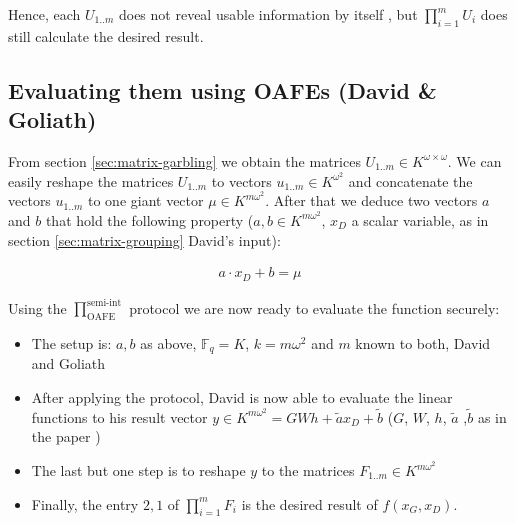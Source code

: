 \documentclass[12pt, a4paper]{article}
\begin{document}
\noindent{} Hence, each $U_{1..m}$ does not reveal usable information by itself
\cite{cramer03}, but $\prod_{i=1}^m U_i$ does still calculate the desired
result.


\subsection{Evaluating them using OAFEs (David \& Goliath)}

From section \ref{sec:matrix-garbling} we obtain the matrices $U_{1..m} \in
K^{\omega \times \omega}$. We can easily reshape the matrices $U_{1..m}$ to
vectors $u_{1..m} \in K^{\omega^2}$ and concatenate the vectors $u_{1..m}$ to
one giant vector $\mu \in K^{m\omega^2}$. After that we deduce two vectors $a$
and $b$ that hold the following property ($a, b \in K^{m\omega^2}$, $x_D$ a
scalar variable, as in section \ref{sec:matrix-grouping} David's input):

\begin{align}
a \cdot x_D + b = \mu
\end{align}

Using the $\prod^{\text{semi-int}}_{\text{OAFE}}$ protocol\cite{davidgoliath} we
are now ready to evaluate the function securely:

\begin{itemize}

\item The setup is: $a, b$ as above, $\mathbb{F}_q = K$, $k = m\omega^2$ and $m$
known to both, David and Goliath

\item After applying the protocol, David is now able to evaluate the linear
functions to his result vector $y \in K^{m\omega^2} = GWh + \tilde{a}x_D +
\tilde{b}$ ($G$, $W$, $h$, $\tilde{a}$ ,$\tilde{b}$ as in the paper
\cite{davidgoliath})

\item The last but one step is to reshape $y$ to the matrices $F_{1..m}
\in K^{m\omega^2}$

\item Finally, the entry $2, 1$ of $\prod_{i=1}^m F_i$ is the desired result of
$f(x_G,x_D)$.

\end{itemize}


\end{document}
